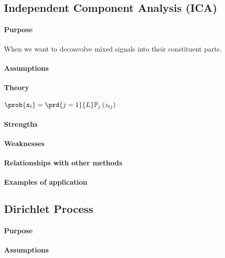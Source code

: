 \subsection{Independent Component Analysis (ICA)}
\paragraph{Purpose}
When we want to deconvolve mixed signals into their constituent parts.\\

\paragraph{Assumptions}
\paragraph{Theory}
$\prob{\bm{z}_{t}} = \prd{j=1}{L}\mathbb{P}_{j}\left(z_{tj}\right)$
\paragraph{Strengths}
\paragraph{Weaknesses}
\paragraph{Relationships with other methods}
\paragraph{Examples of application}

\subsection{Dirichlet Process}
\paragraph{Purpose}
\paragraph{Assumptions}
